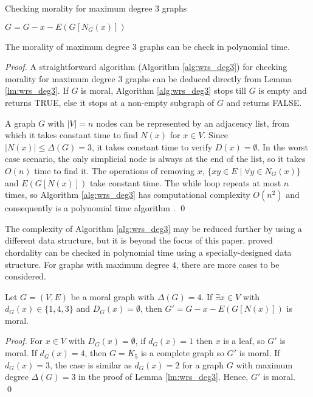 \begin{algorithm}[]
\caption{Checking morality for maximum degree 3 graphs}
\label{alg:wrs_deg3}
\begin{algorithmic}[]
    
    	\State $G=G-x-E(G[N_G(x)])$    	
    \EndWhile
       
     
    \Else 
    
    \EndIf
\end{algorithmic}
\end{algorithm}

\begin{theorem}
\label{thm:wrs_deg3}
The morality of maximum degree $3$ graphs can be check in polynomial time. 
\end{theorem}
\begin{proof}
A straightforward algorithm (Algorithm \ref{alg:wrs_deg3}) for checking morality for maximum degree $3$ graphs can be deduced directly from Lemma \ref{lm:wrs_deg3}. If $G$ is moral, Algorithm \ref{alg:wrs_deg3} stops till $G$ is empty and returns TRUE, else it stops at a non-empty subgraph of $G$ and returns FALSE. 

A graph $G$ with $|V|=n$ nodes can be represented by an adjacency list, from which it takes constant time to find $N(x)$ for $x \in V$. Since $|N(x)| \le \Delta(G)=3$, it takes constant time to verify $D(x)=\emptyset$. In the worst case scenario, the only simplicial node is always at the end of the list, so it takes $O(n)$ time to find it. The operations of removing $x$, $\{xy \in E\mid \forall y \in N_G(x)\}$ and $E(G[N(x)])$ take constant time. The while loop repeats at most $n$ times, so Algorithm \ref{alg:wrs_deg3} has computational complexity $O(n^2)$ and consequently is a polynomial time algorithm . \qed
\end{proof}
The complexity of Algorithm \ref{alg:wrs_deg3} may be reduced further by using a different data structure, but it is beyond the focus of this paper. \citeauthor{rose1976algorithmic}  proved chordality can be checked in polynomial time using a specially-designed data structure. For graphs with maximum degree $4$, there are more cases to be considered. 

\begin{lemma}
\label{lm:deg1_4_3}
Let $G=(V,E)$ be a moral graph with $\Delta(G)=4$. If $\exists x \in V$ with $d_G(x)\in \{1,4,3\}$ and $D_G(x)=\emptyset$, then $G'=G-x-E(G[N(x)])$ is moral. 
\end{lemma}
\begin{proof}
For $x \in V$ with $D_G(x)=\emptyset$, if $d_G(x)=1$ then $x$ is a leaf, so $G'$ is moral. If $d_G(x)=4$, then $G=K_5$ is a complete graph so $G'$ is moral. If $d_G(x)=3$, the case is similar as $d_G(x)=2$ for a graph $G$ with maximum degree $\Delta(G)=3$ in the proof of Lemma \ref{lm:wrs_deg3}. Hence, $G'$ is moral. \qed
\end{proof}

